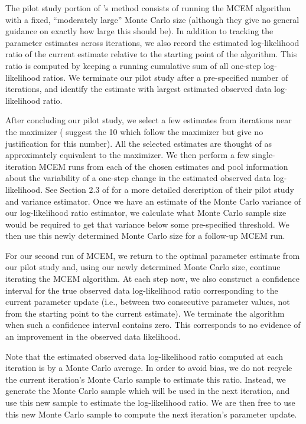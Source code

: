 \documentclass[ss]{imsart}
\theoremstyle{plain}
\theoremstyle{definition}
\theoremstyle{remark}
\begin{document}
The pilot study portion of \citeauthor{Cha95}'s method consists of running the MCEM algorithm with a fixed, ``moderately large'' Monte Carlo size (although they give no general guidance on exactly how large this should be).  In addition to tracking the parameter estimates across iterations, we also record the estimated log-likelihood ratio of the current estimate relative to the starting point of the algorithm. This ratio is computed by keeping a running cumulative sum of all one-step log-likelihood ratios. We terminate our pilot study after a pre-specified number of iterations, and identify the estimate with largest estimated observed data log-likelihood ratio. 

After concluding our pilot study, we select a few estimates from iterations near the maximizer (\citeauthor{Cha95} suggest the 10 which follow the maximizer but give no justification for this number). All the selected estimates are thought of as approximately equivalent to the maximizer. We then perform a few single-iteration MCEM runs from each of the chosen estimates and pool information about the variability of a one-step change in the estimated observed data log-likelihood. See Section 2.3 of \citet{Cha95} for a more detailed description of their pilot study and variance estimator. Once we have an estimate of the Monte Carlo variance of our log-likelihood ratio estimator, we calculate what Monte Carlo sample size would be required to get that variance below some pre-specified threshold\footnotemark. We then use this newly determined Monte Carlo size for a follow-up MCEM run.



For our second run of MCEM, we return to the optimal parameter estimate from our pilot study and, using our newly determined Monte Carlo size, continue iterating the MCEM algorithm. At each step now, we also construct a confidence interval for the true observed data log-likelihood ratio corresponding to the current parameter update (i.e., between two consecutive parameter values, not from the starting point to the current estimate). We terminate the algorithm when such a confidence interval contains zero. This corresponds to no evidence of an improvement in the observed data likelihood.


Note that the estimated observed data log-likelihood ratio computed at each iteration is by a Monte Carlo average. In order to avoid bias, we do not recycle the current iteration's Monte Carlo sample to estimate this ratio. Instead, we generate the Monte Carlo sample which will be used in the next iteration, and use this new sample to estimate the log-likelihood ratio\footnotemark. We are then free to use this new Monte Carlo sample to compute the next iteration's parameter update. 
\end{document}
